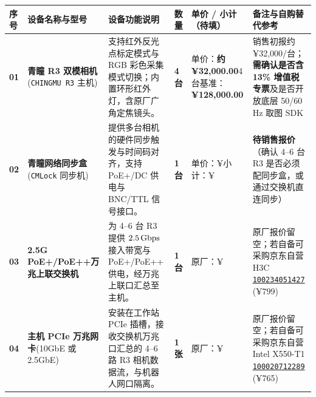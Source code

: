\documentclass[10pt, a4paper]{ctexart}
\renewcommand{\arraystretch}{1.24}
\begin{document}
\begin{table}[H]
\centering
\footnotesize
\renewcommand{\arraystretch}{1.32}
\begin{tabularx}{\textwidth}{@{} C{0.65cm} L{2.7cm} Y C{1.05cm} L{2.65cm} L{3.55cm} @{}}
\toprule
{}
\textbf{序号} & \textbf{设备名称与型号} & \textbf{设备功能说明} & \textbf{数量} & \textbf{单价 / 小计（待填）} & \textbf{备注与自购替代参考} \\
\midrule
\textbf{01} & \textbf{青瞳 R3 双模相机}\newline (\texttt{CHINGMU R3} 主机) & 支持红外反光点标定模式与 RGB 彩色采集模式切换；内置环形红外灯，含原厂广角定焦镜头。 & \textbf{4 台} & 单价：\textbf{约 ¥32,000.00}\newline 4台基准：\textbf{¥128,000.00} & 销售初报约 ¥32,000/台；\textbf{需确认是否含 13\% 增值税专票}及是否开放底层 50/60\,Hz 取图 SDK \\
\textbf{02} & \textbf{青瞳网络同步盒}\newline (\texttt{CMLock} 同步机) & 提供多台相机的硬件同步触发与时间码对齐，支持 PoE+/DC 供电与 BNC/TTL 信号接口。 & \textbf{1 台} & 单价：¥\underline{\hspace{1.35cm}}\newline 小计：¥\underline{\hspace{1.35cm}} & \textbf{待销售报价}（确认 4--6 台 R3 是否必须配同步盒，或通过交换机直连同步） \\
\textbf{03} & \textbf{2.5G PoE+/PoE++}\newline \textbf{万兆上联交换机} & 为 4--6 台 R3 提供 $2.5\text{\,Gbps}$ 接入带宽与 PoE+/PoE++ 供电，经万兆上联口汇总至主机。 & \textbf{1 台} & 原厂：¥\underline{\hspace{1.35cm}} & 原厂报价留空；若自备可采购京东自营 H3C \href{https://item.jd.com/100234051427.html}{\texttt{100234051427}} (¥799) \\
\textbf{04} & \textbf{主机 PCIe 万兆网卡}\newline (10GbE 或 2.5GbE) & 安装在工作站 PCIe 插槽，接收交换机万兆口汇总的 4--6 路 R3 相机数据流，与机器人网口隔离。 & \textbf{1 张} & 原厂：¥\underline{\hspace{1.35cm}} & 原厂报价留空；若自备可采购京东自营 Intel X550-T1 \href{https://item.jd.com/100020712289.html}{\texttt{100020712289}} (¥765) \\

\end{tabularx}
\end{table}
\end{document}

